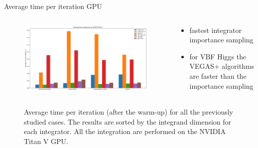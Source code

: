 \documentclass[t,handout,professionalfont,serif]{beamer}
\begin{document}
\begin{frame}{Average time per iteration GPU}
	
		\tiny
	\begin{columns}
		\begin{column}{0.7 \textwidth}
			\begin{figure}
				\includegraphics[width= \columnwidth]{../tex/images/GPU_final.png}
			\end{figure}
			
		\end{column}
			\hspace{-0.5cm}
		\begin{column}{0.3 \textwidth}
			\vspace{0.7cm}
			
			\begin{itemize}
				
				\item fastest integrator importance sampling
				\item for VBF Higgs the VEGAS+ algorithms are faster than the importance sampling
			\end{itemize}
		\end{column}
	\end{columns}
	\begin{figure}
		\caption{Average time per iteration (after the warm-up) for all the previously studied cases. The results are sorted by the integrand dimension for each integrator. All the integration are performed on the NVIDIA Titan V GPU. }
	\end{figure}

\end{frame}

	
\end{document}
